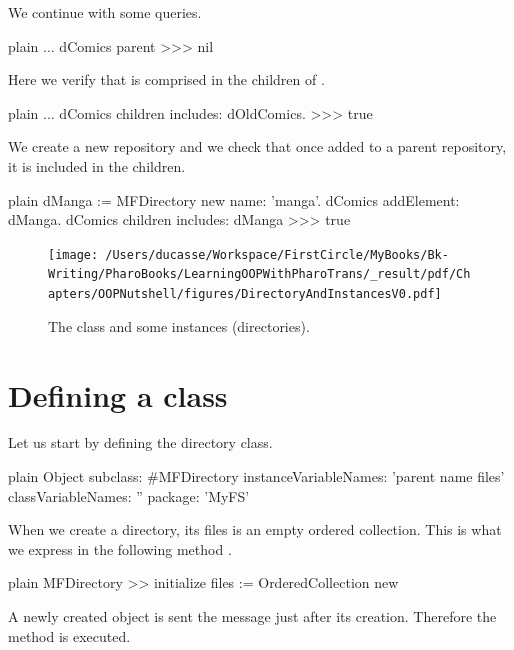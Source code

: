 \documentclass[10pt,twoside,english]{_support/latex/sbabook/sbabook}
\begin{document}
We continue with some queries.

\begin{displaycode}{plain}
	...
dComics parent
>>> nil
\end{displaycode}

Here we verify that  is comprised in the children of . 

\begin{displaycode}{plain}
	...
dComics children includes: dOldComics. 
>>> true
\end{displaycode}

We create a new repository and we check that once added to a parent repository, it is included in the 
children.

\begin{displaycode}{plain}
dManga := MFDirectory new name: 'manga'.
dComics addElement: dManga. 
dComics children includes: dManga
>>> true
\end{displaycode}


\begin{figure}

\begin{center}
\texttt{[image: /Users/ducasse/Workspace/FirstCircle/MyBooks/Bk-Writing/PharoBooks/LearningOOPWithPharoTrans/\_result/pdf/Chapters/OOPNutshell/figures/DirectoryAndInstancesV0.pdf]}\caption{The  class and some instances (directories).\label{directories}}\end{center}
\end{figure}

\section{Defining a class}
Let us start by defining the directory class. 

\begin{displaycode}{plain}
Object subclass: #MFDirectory
	instanceVariableNames: 'parent name files'
	classVariableNames: ''
	package: 'MyFS'
\end{displaycode}

When we create a directory, its files is an empty ordered collection. This is what we express in the following method .

\begin{displaycode}{plain}
MFDirectory >> initialize
	files := OrderedCollection new
\end{displaycode}

A newly created object is sent the message  just after its creation. Therefore the  method is executed. 
\end{document}
